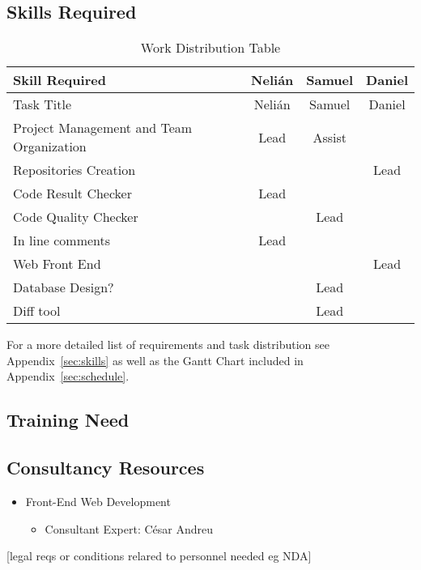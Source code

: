 
\subsection{Skills Required}
\begin{center}
\setlength{\extrarowheight}{1.5pt}
  \begin{longtable}{|m{3.25in}|c|c|c|}
 \caption{Work Distribution Table} \\
   \hline
  
  \centering Skill Required & Nelián & Samuel & Daniel \\
  \hline \hline \endfirsthead
  
     \hline

	\centering Task Title & Nelián & Samuel & Daniel \\  
	\hline \hline \endhead
  
  \endfoot  
  
  Project Management and Team Organization & Lead & Assist & \\ \hline
  Repositories Creation &    &    & Lead \\ \hline
  Code Result Checker & Lead &    & \\ \hline
  Code Quality Checker &    & Lead & \\ \hline
  In line comments & Lead &    & \\ \hline
  Web Front End &    &    & Lead \\ \hline
  Database Design? &    & Lead & \\ \hline
  Diff tool &    & Lead & \\ \hline
   \end{longtable}
\end{center}

For a more detailed list of requirements and task distribution see Appendix~\ref{sec:skills} as well as the Gantt Chart included in Appendix~\ref{sec:schedule}.

\subsection{Training Need}

\subsection{Consultancy Resources}
\begin{itemize}
\item Front-End Web Development
\begin{itemize}
\item Consultant Expert: César Andreu
\end{itemize}
\end{itemize}

[legal reqs or conditions relared to personnel needed eg NDA]